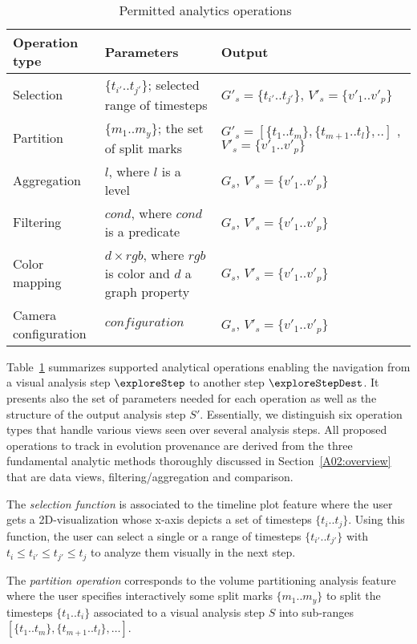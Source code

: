 \begin{table}[b]
 \centering \scriptsize
 \begin{tabular}{|p{2.5cm}|p{4cm}|p{3cm}|} \hline
\textbf{Operation type}  & \textbf{Parameters} & \textbf{Output}  \\ \hline
Selection&  $\{t_{i'}..t_{j'}\}$; selected range of timesteps & $G'_{s}=\{t_{i'}..t_{j'}\}$,  $V'_{s}=\{v'_{1}..v'_{p}\}$ \\ \hline
Partition&$\{m_1..m_y\}$; the set of split marks & $G'_{s}=[\{t_1..t_m\},\{t_{m+1}..t_l\},..]$ ,  $V'_{s}=\{v'_{1}..v'_{p}\}$  \\ \hline
Aggregation&    $l$, where $l$ is a level & $G_{s}$,  $V'_{s}=\{v'_{1}..v'_{p}\}$ \\ \hline
Filtering&    $cond$, where $cond$ is a predicate& $G_{s}$,  $V'_{s}=\{v'_{1}..v'_{p}\}$  \\ \hline
Color mapping&  $d \times rgb $, where $rgb$ is color and $d$ a graph property &$G_{s}$,  $V'_{s}=\{v'_{1}..v'_{p}\}$  \\ \hline
Camera configuration&  $configuration$   & $G_{s}$, $V'_{s}=\{v'_{1}..v'_{p}\}$  \\ \hline
\end{tabular}
\caption{Permitted analytics operations~\cite{Bruder2019}}
\label{table:ops}
 \end{table}

Table~\ref{table:ops} summarizes supported analytical operations enabling the navigation from a visual analysis step $\exploreStep$ to another step $\exploreStepDest$.
It presents also the set of parameters needed for each operation as well as the structure of the output analysis step $S'$.
Essentially, we distinguish six operation types that handle various views seen over several analysis steps.
All proposed operations to track in evolution provenance are derived from the three fundamental analytic methods thoroughly discussed in Section~\ref{A02:overview} that are data views, filtering/aggregation and comparison.


The \emph{selection function} is associated to the timeline plot feature where the user gets a 2D-visualization whose x-axis depicts a set of timesteps $\{t_i..t_j\}$.
Using this function, the user can select a single or a range of timesteps $\{t_{i'}..t_{j'}\}$  with $t_i \leq t_{i'} \leq t_{j'} \leq t_{j}$ to analyze them visually in the next step.

The \emph{partition operation} corresponds to the volume partitioning analysis feature 
where the user specifies interactively some split marks $\{m_1..m_y\}$ to split the timesteps $\{t_1..t_i\}$ associated to a visual analysis step $S$ into sub-ranges $[\{t_1..t_m\},\{t_{m+1}..t_l\},\ldots]$. 


